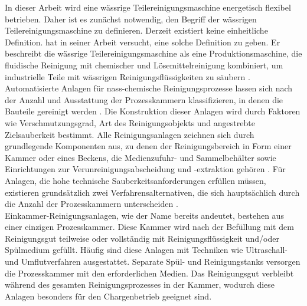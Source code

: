 In dieser Arbeit wird eine wässrige Teilereinigungsmaschine energetisch flexibel betrieben. Daher ist es zunächst notwendig, den Begriff der wässrigen Teilereinigungsmaschine zu definieren. Derzeit existiert keine einheitliche Definition. \textcite{fuhrlander-volkerModellingControlAqueous2023} hat in seiner Arbeit versucht, eine solche Definition zu geben. Er beschreibt die wässrige Teilereinigungsmaschine als eine Produktionsmaschine, die fluidische Reinigung mit chemischer und Lösemittelreinigung kombiniert, um industrielle Teile mit wässrigen Reinigungsflüssigkeiten zu säubern \cite{fuhrlander-volkerModellingControlAqueous2023, dindeutschesinstitutfurnormunge.v.FertigungsverfahrenReinigenEinordnungBeuthVerlagGmbH, OekologischeUndOekonomische}.\\

Automatisierte Anlagen für nass-chemische Reinigungsprozesse lassen sich nach der Anzahl und Ausstattung der Prozesskammern klassifizieren, in denen die Bauteile gereinigt werden \cite{OekologischeUndOekonomische}. Die Konstruktion dieser Anlagen wird durch Faktoren wie Verschmutzungsgrad, Art des Reinigungsobjekts und angestrebte Zielsauberkeit bestimmt. Alle Reinigungsanlagen zeichnen sich durch grundlegende Komponenten aus, zu denen der Reinigungsbereich in Form einer Kammer oder eines Beckens, die Medienzufuhr- und Sammelbehälter sowie Einrichtungen zur Verunreinigungsabscheidung und -extraktion gehören \cite{jungeBeitragZurEnergieeffizienzbewertung2019}. Für Anlagen, die hohe technische Sauberkeitsanforderungen erfüllen müssen, existieren grundsätzlich zwei Verfahrensalternativen, die sich hauptsächlich durch die Anzahl der Prozesskammern unterscheiden \cite{OekologischeUndOekonomische}.\\

Einkammer-Reinigungsanlagen, wie der Name bereits andeutet, bestehen aus einer einzigen Prozesskammer. Diese Kammer wird nach der Befüllung mit dem Reinigungsgut teilweise oder vollständig mit Reinigungsflüssigkeit und/oder Spülmedium gefüllt. Häufig sind diese Anlagen mit Techniken wie Ultraschall- und Umflutverfahren ausgestattet. Separate Spül- und Reinigungstanks versorgen die Prozesskammer mit den erforderlichen Medien. Das Reinigungsgut verbleibt während des gesamten Reinigungsprozesses in der Kammer, wodurch diese Anlagen besonders für den Chargenbetrieb geeignet sind.\\

